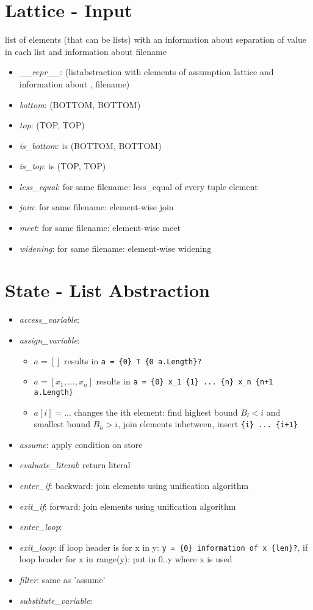\documentclass[11pt]{article}
\begin{document}
\section{Lattice - Input}

list of elements (that can be lists) with an information about separation of value in each list and information about filename

\begin{itemize}
\item \textit{\_\_repr\_\_}: (listabstraction with elements of assumption lattice and information about , filename)
\item \textit{bottom}: (BOTTOM, BOTTOM)
\item \textit{top}: (TOP, TOP)
\item \textit{is\_bottom}: is (BOTTOM, BOTTOM)
\item \textit{is\_top}: is (TOP, TOP)
\item \textit{less\_equal}: for same filename: less\_equal of every tuple element
\item \textit{join}: for same filename: element-wise join
\item \textit{meet}: for same filename: element-wise meet
\item \textit{widening}: for same filename: element-wise widening
\end{itemize}

\section{State - List Abstraction}

\begin{itemize}
\item \textit{access\_variable}: 
\item \textit{assign\_variable}:
\begin{itemize}
\item $a = []$ results in \verb|a = {0} T {0 a.Length}?|
\item $a = [x_1,...,x_n]$ results in \verb|a = {0} x_1 {1} ... {n} x_n {n+1 a.Length}|
\item $a[i] = ...$ changes the ith element: find highest bound $B_l < i$ and smallest bound $B_h > i$, join elements inbetween, insert \verb|{i} ... {i+1}|
\end{itemize}
\item \textit{assume}: apply condition on store
\item \textit{evaluate\_literal}: return literal
\item \textit{enter\_if}: backward: join elements using unification algorithm
\item \textit{exit\_if}: forward: join elements using unification algorithm
\item \textit{enter\_loop}:
\item \textit{exit\_loop}: if loop header is for x in y: \verb|y = {0} information of x {len}?|, if loop header for x in range(y): put in 0..y where x is used
\item \textit{filter}: same as 'assume'
\item \textit{substitute\_variable}:
\end{itemize}
\end{document}
